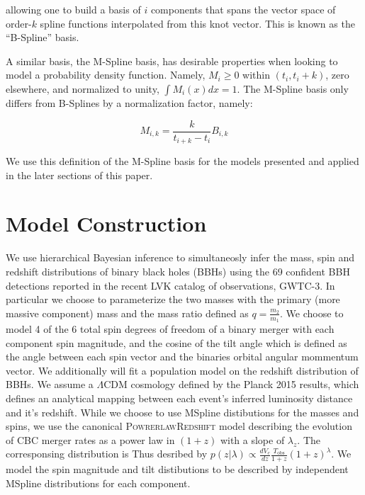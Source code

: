\noindent allowing one to build a basis of $i$ components that spans the vector space of order-$k$ spline functions interpolated 
from this knot vector. This is known as the ``B-Spline'' basis. 

A similar basis, the M-Spline basis, has desirable properties when looking to model a probability density function. Namely, 
$M_i \geq 0$ within $(t_i, t_i+k)$, zero elsewhere, and normalized to unity, $\int M_i(x)dx = 1$. The M-Spline basis only differs 
from B-Splines by a normalization factor, namely:

\begin{equation}\label{eq:MB_SplineRelation}
M_{i,k} = \frac{k}{t_{i+k} - t_i} B_{i,k}
\end{equation}

\noindent We use this definition of the M-Spline basis for the models presented and applied in the later sections of this paper. 

\section{Model Construction}

We use hierarchical Bayesian inference to simultaneosly infer the mass, spin and redshift distributions of binary black holes (BBHs) using 
the 69 confident BBH detections reported in the recent LVK catalog of observations, GWTC-3. In particular we choose to parameterize the two
masses with the primary (more massive component) mass and the mass ratio defined as $q=\frac{m_2}{m_1}$. We choose to model 4 of the 6 total 
spin degrees of freedom of a binary merger with each component spin magnitude, and the cosine of the tilt angle which is defined as the angle 
between each spin vector and the binaries orbital angular mommentum vector. We additionally will fit a population model on the redshift distribution
of BBHs. We assume a $\Lambda\mathrm{CDM}$ cosmology defined by the Planck 2015 results, which defines an analytical mapping between each event's inferred
luminosity distance and it's redshift. While we choose to use MSpline distibutions for the masses and spins, we use the canonical \textsc{PowrerlawRedshift}
model describing the evolution of CBC merger rates as a power law in $(1+z)$ with a slope of $\lambda_z$. The corresponsing distribution is Thus
desribed by $p(z|\lambda)\propto \frac{dV_c}{dz} \frac{T_\mathrm{obs}}{1+z} (1+z)^\lambda$. We model the spin magnitude and tilt distibutions to be 
described by independent MSpline distributions for each component. 
